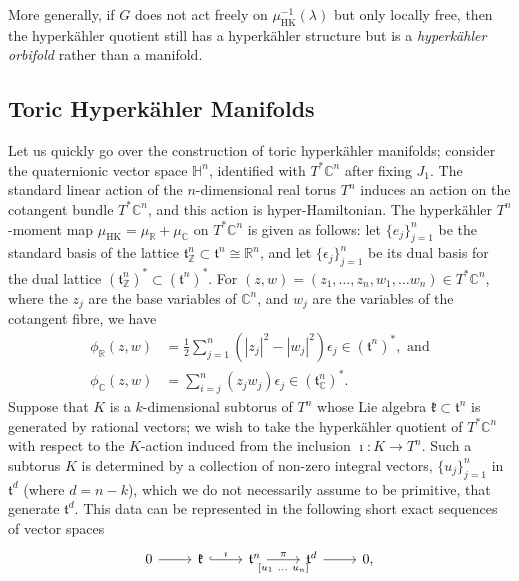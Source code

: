 \documentclass{article}
\newcommand{\ra}{\rightarrow}
\newcommand{\e}{\epsilon}
\newcommand{\RR}{\mathbb{R}}
\newcommand{\CC}{\mathbb{C}}
\newcommand{\ZZ}{\mathbb{Z}}
\newcommand{\HH}{\mathbb{H}}
\newcommand{\mfk}{\mathfrak{k}}
\newcommand{\mft}{\mathfrak{t}}
\DeclareMathOperator{\HK}{HK}
\begin{document}
	More generally, if $G$ does not act freely on $\mu_{\HK}^{-1}(\lambda)$ but only locally free, then the hyperk\"ahler quotient still has a hyperk\"ahler structure but is a \emph{hyperk\"ahler orbifold} rather than a manifold.
	
	
	
	\subsection{Toric Hyperk\"ahler Manifolds}
	
	Let us quickly go over the construction of toric hyperk\"ahler manifolds; consider the quaternionic vector space $\HH^{n}$, identified with $T^{\ast}\CC^{n}$ after fixing $J_{1}$. The standard linear action of the $n$-dimensional real torus $T^{n}$ induces an action on the cotangent bundle $T^{\ast}\CC^{n}$, and this action is hyper-Hamiltonian. The hyperk\"ahler $T^{n}$-moment map $\mu_{\HK} = \mu_{\RR} + \mu_{\CC}$ on $T^{\ast}\CC^{n}$ is given as follows: let $\{e_{j}\}_{j=1}^{n}$ be the standard basis of the lattice $\mft_{\ZZ}^{n} \subset \mft^{n} \cong \RR^{n}$, and let $\{\e_{j}\}_{j=1}^{n}$ be its dual basis for the dual lattice $(\mft_{\ZZ}^{n})^{\ast} \subset (\mft^{n})^{\ast}$. For $(z,w) = (z_{1},\ldots, z_{n}, w_{1},\ldots w_{n}) \in T^{\ast}\CC^{n}$, where the $z_{j}$ are the base variables of $\CC^{n}$, and $w_{j}$ are the variables of the cotangent fibre, we have
	\begin{align*}%
		\phi_{\RR}(z,w) &= \frac{1}{2} \sum_{j=1}^{n} \left( |z_{j}|^2 - |w_{j}|^2 \right) \e_{j} \in (\mft^{n})^{\ast},
		\mbox{ and}\\
		\phi_{\CC}(z,w) &= \sum_{i=j}^{n} (z_{j} w_{j}) \e_{j} \in (\mft_{\CC}^{n})^{\ast}.
	\end{align*}
	Suppose that $K$ is a $k$-dimensional subtorus of $T^{n}$ whose Lie algebra $\mfk \subset \mft^{n}$ is generated by rational vectors; we wish to take the hyperk\"ahler quotient of $T^{\ast}\CC^{n}$ with respect to the $K$-action induced from the inclusion $\imath : K \ra T^{n}$. Such a subtorus $K$ is determined by a collection of non-zero integral vectors, $\{u_{j}\}_{j=1}^{n}$ in $\mft^{d}$ (where $d = n - k$), which we do not necessarily assume to be primitive, that generate $\mft^{d}$. This data can be represented in the following short exact sequences of vector spaces
	\[
		\begin{tikzcd}[ampersand replacement=\&]
			0 \ar[r] \&
			\mfk \ar[r, hook, "\imath"] \& \mft^{n} \arrow{r}{\pi}[swap]{[u_{1}\ \ldots \ u_{n}]} \& \mft^{d} \ar[r] \& 0,
		\end{tikzcd}
	\]
\end{document}
